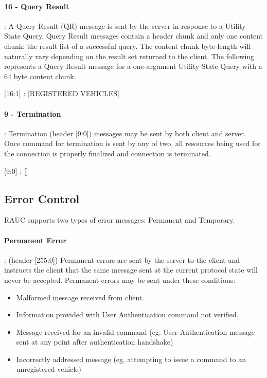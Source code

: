 \paragraph{16 - Query Result}: A Query Result (QR) message is sent by the server in response to a Utility State Query. Query Result messages contain a  header chunk and only one content chunk: the result list of a successful query. The content chunk byte-length will naturally vary depending on the result set returned to the client. The following represents a Query Result message for a one-argument Utility State Query with a 64 byte content chunk.

\begin{center}
{\textsf{[16:1] : [REGISTERED VEHICLES]}}
\end{center}


\paragraph{9 - Termination}: Termination (header [9:0]) messages may be sent by both client and server. Once command for termination is sent by any of two, all resources being used for the connection is properly finalized and connection is terminated.

\begin{center}
{\textsf{[9:0] : []}}
\end{center}



\subsection{Error Control}
\label{sec:pdus:err}
RAUC supports two types of error messages: Permanent and Temporary.

\paragraph{Permanent Error}: (header [255:0]) Permanent errors are sent by the server to the client and instructs the client that the same message sent at the current protocol state will never be accepted. Permanent errors may be sent under these conditions:
\begin{itemize}
\item Malformed message received from client.
\item Information provided with User Authentication command not verified.
\item Message received for an invalid command (eg. User Authentication message sent at any point after authentication handshake)
\item Incorrectly addressed message (eg. attempting to issue a command to an unregistered vehicle)
  \end{itemize}
  
